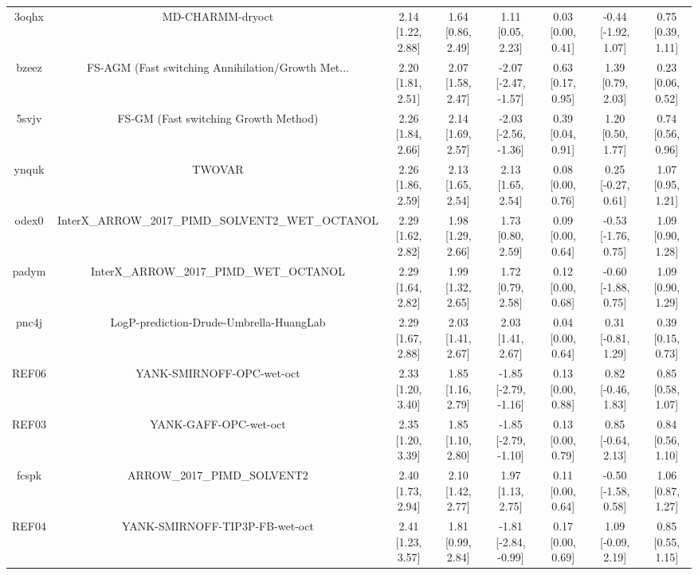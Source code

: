 \documentclass{article}
\begin{document}
\begin{center}
\begin{longtable}{|cccccccc|}
 3oqhx &                                   MD-CHARMM-dryoct &  2.14 [1.22, 2.88] &  1.64 [0.86, 2.49] &     1.11 [0.05, 2.23] &  0.03 [0.00, 0.41] &  -0.44 [-1.92, 1.07] &     0.75 [0.39, 1.11] \\
 bzeez &  FS-AGM (Fast switching Annihilation/Growth Met... &  2.20 [1.81, 2.51] &  2.07 [1.58, 2.47] &  -2.07 [-2.47, -1.57] &  0.63 [0.17, 0.95] &    1.39 [0.79, 2.03] &     0.23 [0.06, 0.52] \\
 5svjv &               FS-GM (Fast switching Growth Method) &  2.26 [1.84, 2.66] &  2.14 [1.69, 2.57] &  -2.03 [-2.56, -1.36] &  0.39 [0.04, 0.91] &    1.20 [0.50, 1.77] &     0.74 [0.56, 0.96] \\
 ynquk &                                             TWOVAR &  2.26 [1.86, 2.59] &  2.13 [1.65, 2.54] &     2.13 [1.65, 2.54] &  0.08 [0.00, 0.76] &   0.25 [-0.27, 0.61] &     1.07 [0.95, 1.21] \\
 odex0 &  InterX\_ARROW\_2017\_PIMD\_SOLVENT2\_WET\_OCTANOL &  2.29 [1.62, 2.82] &  1.98 [1.29, 2.66] &     1.73 [0.80, 2.59] &  0.09 [0.00, 0.64] &  -0.53 [-1.76, 0.75] &     1.09 [0.90, 1.28] \\
 padym &            InterX\_ARROW\_2017\_PIMD\_WET\_OCTANOL &  2.29 [1.64, 2.82] &  1.99 [1.32, 2.65] &     1.72 [0.79, 2.58] &  0.12 [0.00, 0.68] &  -0.60 [-1.88, 0.75] &     1.09 [0.90, 1.29] \\
 pnc4j &            LogP-prediction-Drude-Umbrella-HuangLab &  2.29 [1.67, 2.88] &  2.03 [1.41, 2.67] &     2.03 [1.41, 2.67] &  0.04 [0.00, 0.64] &   0.31 [-0.81, 1.29] &     0.39 [0.15, 0.73] \\
 REF06 &                          YANK-SMIRNOFF-OPC-wet-oct &  2.33 [1.20, 3.40] &  1.85 [1.16, 2.79] &  -1.85 [-2.79, -1.16] &  0.13 [0.00, 0.88] &   0.82 [-0.46, 1.83] &     0.85 [0.58, 1.07] \\
 REF03 &                              YANK-GAFF-OPC-wet-oct &  2.35 [1.20, 3.39] &  1.85 [1.10, 2.80] &  -1.85 [-2.79, -1.10] &  0.13 [0.00, 0.79] &   0.85 [-0.64, 2.13] &     0.84 [0.56, 1.10] \\
 fcspk &                        ARROW\_2017\_PIMD\_SOLVENT2 &  2.40 [1.73, 2.94] &  2.10 [1.42, 2.77] &     1.97 [1.13, 2.75] &  0.11 [0.00, 0.64] &  -0.50 [-1.58, 0.58] &     1.06 [0.87, 1.27] \\
 REF04 &                     YANK-SMIRNOFF-TIP3P-FB-wet-oct &  2.41 [1.23, 3.57] &  1.81 [0.99, 2.84] &  -1.81 [-2.84, -0.99] &  0.17 [0.00, 0.69] &   1.09 [-0.09, 2.19] &     0.85 [0.55, 1.15] \\

\end{longtable}
\end{center}
\end{document}
